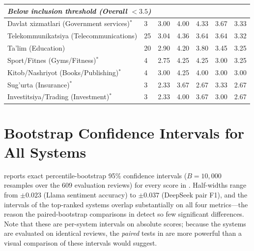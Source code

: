 \documentclass[bdcc,article,submit,moreauthors]{Definitions/mdpi}
\begin{document}
\begin{table}[H]
\begin{tabular}{llccccc}
\midrule
\multicolumn{7}{l}{\textit{Below inclusion threshold (Overall $< 3.5$)}} \\
\midrule
Davlat xizmatlari (Government services)$^{*}$ & 3 & 3.00 & 4.00 & 4.33 & 3.67 & 3.33 \\
Telekommunikatsiya (Telecommunications)       & 25 & 3.04 & 4.36 & 3.64 & 3.64 & 3.32 \\
Ta'lim (Education)                            & 20 & 2.90 & 4.20 & 3.80 & 3.45 & 3.25 \\
Sport/Fitnes (Gyms/Fitness)$^{*}$          & 4  & 2.75 & 4.25 & 4.25 & 3.00 & 3.25 \\
Kitob/Nashriyot (Books/Publishing)$^{*}$  & 4  & 3.00 & 4.25 & 4.00 & 3.00 & 3.00 \\
Sug'urta (Insurance)$^{*}$                & 3  & 2.33 & 3.67 & 2.67 & 3.33 & 2.67 \\
Investitsiya/Trading (Investment)$^{*}$   & 3  & 2.33 & 4.00 & 3.67 & 3.00 & 2.67 \\
\bottomrule
\end{tabular}
\end{table}

\section[\appendixname~\thesection]{Bootstrap Confidence Intervals for All Systems}
\label{sec:appendix_cis}

 reports exact percentile-bootstrap 95\% confidence intervals ($B{=}10{,}000$ resamples over the 609 evaluation reviews) for every score in . Half-widths range from $\pm 0.023$ (Llama sentiment accuracy) to $\pm 0.037$ (DeepSeek pair F1), and the intervals of the top-ranked systems overlap substantially on all four metrics---the reason the paired-bootstrap comparisons in  detect so few significant differences. Note that these are per-system intervals on absolute scores; because the systems are evaluated on identical reviews, the \emph{paired} tests in  are more powerful than a visual comparison of these intervals would suggest.
\end{document}
